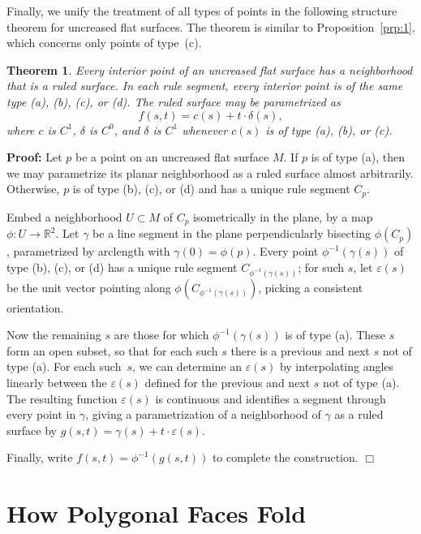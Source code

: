 \documentclass[11pt,letterpaper]{article}
\newtheorem{theorem}{Theorem}
\newenvironment{proof}{\noindent\textbf{Proof: }\ignorespaces}
  {\hspace*{\fill}$\Box$\medskip}
\let\epsilon=\varepsilon
\newcommand\eps{\epsilon}
\newcommand\R{\mathbb R}
\begin{document}
Finally, we unify the treatment of all types of points in the
following structure theorem for uncreased flat surfaces.  The theorem
is similar to Proposition~\ref{prp:1}, which concerns only points of
type~(c).

\begin{theorem}
  Every interior point of an uncreased flat surface has a neighborhood that is
  a ruled surface.  In each rule segment, every interior point is of the same
  type (a), (b), (c), or (d).  The ruled surface may be parametrized
  as
  $$ f(s, t) = c(s) + t \cdot \delta(s), $$
  where $c$ is $C^1$, $\delta$ is $C^0$, and $\delta$ is $C^1$ whenever
  $c(s)$ is of type (a), (b), or (c).
\end{theorem}
\begin{proof}
  Let $p$ be a point on an uncreased flat surface $M$.  If $p$ is of
  type (a), then we may parametrize its planar neighborhood as a ruled
  surface almost arbitrarily.  Otherwise, $p$ is of type (b), (c), or
  (d) and has a unique rule segment $C_p$.

  Embed a neighborhood $U \subset M$ of $C_p$ isometrically in the
  plane, by a map $\phi : U \to \R^2$.  Let $\gamma$ be a line segment
  in the plane perpendicularly bisecting $\phi(C_p)$, parametrized by
  arclength with $\gamma(0) = \phi(p).$  Every point $\phi^{-1}(\gamma(s))$
  of type (b), (c), or (d) has a unique rule segment $C_{\phi^{-1}(\gamma(s))}$;
  for such $s$, let $\eps(s)$ be the unit vector pointing along
  $\phi(C_{\phi^{-1}(\gamma(s))})$, picking a consistent orientation.

  Now the remaining $s$ are those for which $\phi^{-1}(\gamma(s))$ is of type
  (a).  These $s$ form an open subset, so that for each such $s$ there
  is a previous and next $s$ not of type (a).  For each such~$s$,
  we can determine an $\eps(s)$ by interpolating angles linearly between
  the $\eps(s)$ defined for the previous and next $s$ not of type (a).
  The resulting function $\eps(s)$ is continuous and identifies a
  segment through every point in $\gamma$, giving a parametrization of
  a neighborhood of $\gamma$ as a ruled surface by $g(s, t) =
  \gamma(s) + t \cdot \eps(s)$.

  Finally, write $f(s, t) = \phi^{-1}(g(s, t))$ to complete the construction.
\end{proof}



\section{How Polygonal Faces Fold}
\end{document}
